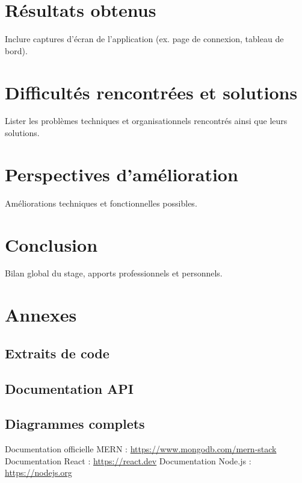 \documentclass[12pt,a4paper]{report}
\begin{document}
\chapter{Résultats obtenus}
Inclure captures d’écran de l’application (ex. page de connexion, tableau de bord).  

\chapter{Difficultés rencontrées et solutions}
Lister les problèmes techniques et organisationnels rencontrés ainsi que leurs solutions.  

\chapter{Perspectives d’amélioration}
Améliorations techniques et fonctionnelles possibles.  

\chapter{Conclusion}
Bilan global du stage, apports professionnels et personnels.  

\appendix
\chapter{Annexes}
\section{Extraits de code}
\section{Documentation API}
\section{Diagrammes complets}

\begin{thebibliography}{9}
 Documentation officielle MERN : \url{https://www.mongodb.com/mern-stack}
 Documentation React : \url{https://react.dev}
 Documentation Node.js : \url{https://nodejs.org}
\end{thebibliography}
\end{document}
